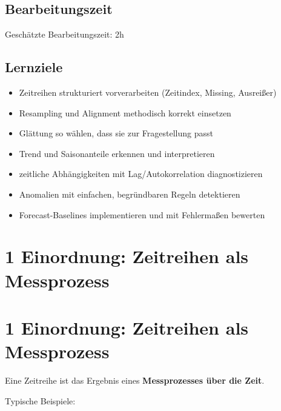 \documentclass[
  ngerman,
  letterpaper,
  DIV=11]{scrreprt}
\providecommand{\tightlist}{%
  \setlength{\itemsep}{0pt}\setlength{\parskip}{0pt}}
\begin{document}
\section*{Bearbeitungszeit}\label{bearbeitungszeit}


Geschätzte Bearbeitungszeit: 2h

\section*{Lernziele}\label{lernziele}


\begin{itemize}
\tightlist
\item
  Zeitreihen strukturiert vorverarbeiten (Zeitindex, Missing, Ausreißer)
\item
  Resampling und Alignment methodisch korrekt einsetzen
\item
  Glättung so wählen, dass sie zur Fragestellung passt
\item
  Trend und Saisonanteile erkennen und interpretieren
\item
  zeitliche Abhängigkeiten mit Lag/Autokorrelation diagnostizieren
\item
  Anomalien mit einfachen, begründbaren Regeln detektieren
\item
  Forecast-Baselines implementieren und mit Fehlermaßen bewerten
\end{itemize}


\chapter{1 Einordnung: Zeitreihen als
Messprozess}\label{einordnung-zeitreihen-als-messprozess}


\chapter{1 Einordnung: Zeitreihen als
Messprozess}\label{einordnung-zeitreihen-als-messprozess-1}

Eine Zeitreihe ist das Ergebnis eines \textbf{Messprozesses über die
Zeit}.

Typische Beispiele:
\end{document}

